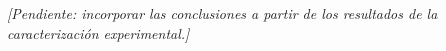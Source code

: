 \textit{[Pendiente: incorporar las conclusiones a partir de los resultados de la caracterización experimental.]}
